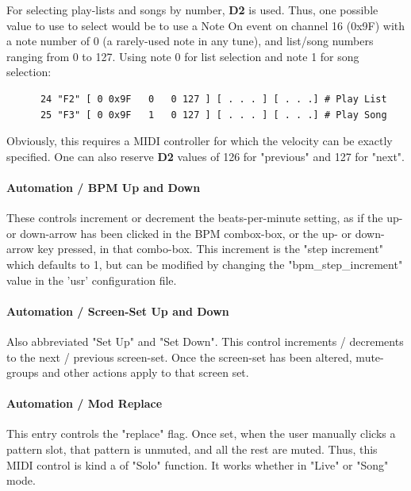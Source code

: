    For selecting play-lists and songs by number, \textbf{D2} is used.
   Thus, one possible value to use to select would be to use a 
   Note On event on channel 16 (0x9F) with a note number of 0 (a rarely-used
   note in any tune), and list/song numbers ranging from 0 to 127.  Using note
   0 for list selection and note 1 for song selection:

   \begin{verbatim}
      24 "F2" [ 0 0x9F   0   0 127 ] [ . . . ] [ . . .] # Play List
      25 "F3" [ 0 0x9F   1   0 127 ] [ . . . ] [ . . .] # Play Song
   \end{verbatim}

   Obviously, this requires a MIDI controller for which the velocity can be
   exactly specified.  One can also reserve \textbf{D2} values of 126 for
   "previous" and 127 for "next".

\paragraph{Automation / BPM Up and Down}
\label{paragraph:configuration_midi_ctrl_bpmupdn}

   These controls increment or decrement the beats-per-minute setting, as if
   the up- or down-arrow has been clicked in the BPM combox-box, or the up- or
   down-arrow key pressed, in that combo-box.
   This increment is the
   "step increment" which defaults to 1, but can be modified by
   changing the "bpm\_step\_increment" value in the 'usr'
   configuration file.

\paragraph{Automation / Screen-Set Up and Down}
\label{paragraph:configuration_midi_ctrl_ssupdn}

   Also abbreviated "Set Up" and "Set Down".
   This control increments / decrements to the next / previous screen-set. 
   Once the screen-set has been altered, mute-groups and other
   actions apply to that screen set.

\paragraph{Automation / Mod Replace}
\label{paragraph:configuration_midi_ctrl_modrep}

   This entry controls the "replace" flag.
   Once set, when the user manually clicks a pattern slot,
   that pattern is unmuted, and all the rest are muted.
   Thus, this MIDI control is kind a of "Solo" function.
   It works whether in "Live" or "Song" mode.

